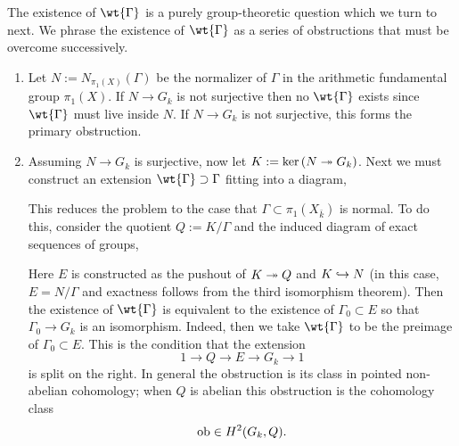 \documentclass[main.tex]{subfiles}
\begin{document}
The existence of $\wt{\Gamma}$ is a purely group-theoretic question which we turn to next. We phrase the existence of $\wt{\Gamma}$ as a series of obstructions that must be overcome successively.
\begin{enumerate}
\item Let $N := N_{\pi_1(X)}(\Gamma)$ be the normalizer of $\Gamma$ in the arithmetic fundamental group $\pi_1(X)$. If $N \to G_k$ is not surjective then no $\wt{\Gamma}$ exists since $\wt{\Gamma}$ must live inside $N$. If $N \to G_k$ is not surjective, this forms the primary obstruction. 

\item Assuming $N \to G_k$ is surjective, now let $K := \ker{(N \twoheadrightarrow G_k)}$. Next we must construct an extension $\wt{\Gamma} \supset \Gamma$ fitting into a diagram,
\begin{center}
\end{center}
This reduces the problem to the case that $\Gamma \subset \pi_1(X_{\bar{k}})$ is normal. To do this, consider the quotient $Q := K / \Gamma$ and the induced diagram of exact sequences of groups,
\begin{center}
\end{center}
Here $E$ is constructed as the pushout of $K \twoheadrightarrow Q$ and $K \hookrightarrow N$ (in this case, $E = N / \Gamma$ and exactness follows from the third isomorphism theorem). Then the existence of $\wt{\Gamma}$ is equivalent to the existence of $\Gamma_0 \subset E$ so that $\Gamma_0 \to G_k$ is an isomorphism. Indeed, then we take $\wt{\Gamma}$ to be the preimage of $\Gamma_0 \subset E$. This is the condition that the extension
\[ 1 \to Q \to E \to G_k \to 1 \]
is split on the right. In general the obstruction is its class in pointed non-abelian cohomology; when $Q$ is abelian this obstruction is the cohomology class
\[ \mathrm{ob} \in H^2(G_k,Q). \]
\end{enumerate}
\end{document}

